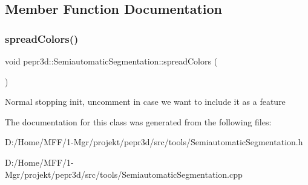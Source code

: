 \subsection{Member Function Documentation}
\mbox{\label{classpepr3d_1_1_semiautomatic_segmentation_a163c52c9b1e672ba76141923ab87eb0a}} 
\subsubsection{\texorpdfstring{spreadColors()}{spreadColors()}}
{\footnotesize\ttfamily void pepr3d\+::\+Semiautomatic\+Segmentation\+::spread\+Colors (\begin{DoxyParamCaption}{ }\end{DoxyParamCaption})\hspace{0.3cm}{\ttfamily [private]}}

Normal stopping init, uncomment in case we want to include it as a feature 

The documentation for this class was generated from the following files\+:\begin{DoxyCompactItemize}
\item 
D\+:/\+Home/\+M\+F\+F/1-\/\+Mgr/projekt/pepr3d/src/tools/Semiautomatic\+Segmentation.\+h\item 
D\+:/\+Home/\+M\+F\+F/1-\/\+Mgr/projekt/pepr3d/src/tools/Semiautomatic\+Segmentation.\+cpp\end{DoxyCompactItemize}
